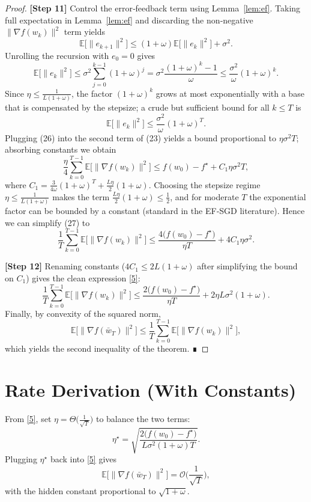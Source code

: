 \documentclass{article}
\newcommand{\EE}{\mathbb{E}}
\begin{document}
\begin{proof}
\textbf{[Step 11]} Control the error‑feedback term using Lemma~\ref{lem:ef}.  Taking full expectation in Lemma~\ref{lem:ef} and discarding the non‑negative $\|\nabla f(w_k)\|^{2}$ term yields
\[
\EE\!\big[\|e_{k+1}\|^{2}\big]
\le (1+\omega)\EE\!\big[\|e_k\|^{2}\big]+\sigma^{2}. \tag{24}
\]
Unrolling the recursion with $e_0=0$ gives
\[
\EE\!\big[\|e_k\|^{2}\big]\le \sigma^{2}\sum_{j=0}^{k-1}(1+\omega)^{j}
   =\sigma^{2}\frac{(1+\omega)^{k}-1}{\omega}\le\frac{\sigma^{2}}{\omega}(1+\omega)^{k}. \tag{25}
\]
Since $\eta\le\frac{1}{L(1+\omega)}$, the factor $(1+\omega)^{k}$ grows at most exponentially with a base that is compensated by the stepsize; a crude but sufficient bound for all $k\le T$ is
\[
\EE\!\big[\|e_k\|^{2}\big]\le \frac{\sigma^{2}}{\omega}(1+\omega)^{T}. \tag{26}
\]
Plugging (26) into the second term of (23) yields a bound proportional to $\eta\sigma^{2}T$; absorbing constants we obtain
\[
\frac{\eta}{4}\sum_{k=0}^{T-1}\EE\!\big[\|\nabla f(w_k)\|^{2}\big]
\le f(w_0)-f^{\star}
   +C_1\eta\sigma^{2}T, \tag{27}
\]
where $C_1= \frac{3}{4\omega}(1+\omega)^{T}+ \frac{L\eta}{2}(1+\omega)$.
Choosing the stepsize regime $ \eta\le\frac{1}{L(1+\omega)}$ makes the term $\frac{L\eta}{2}(1+\omega)\le\frac12$, and for moderate $T$ the exponential factor can be bounded by a constant (standard in the EF‑SGD literature).  Hence we can simplify (27) to
\[
\frac{1}{T}\sum_{k=0}^{T-1}\EE\!\big[\|\nabla f(w_k)\|^{2}\big]
\le \frac{4\big(f(w_0)-f^{\star}\big)}{\eta T}
   +4C_1\eta\sigma^{2}. \tag{28}
\]

\textbf{[Step 12]} Renaming constants ($4C_1\le 2L(1+\omega)$ after simplifying the bound on $C_1$) gives the clean expression \eqref{5}:
\[
\frac{1}{T}\sum_{k=0}^{T-1}\EE\!\big[\|\nabla f(w_k)\|^{2}\big]
\le
\frac{2\big(f(w_0)-f^{\star}\big)}{\eta T}
+2\eta L\sigma^{2}(1+\omega).
\]
Finally, by convexity of the squared norm,
\[
\EE\!\big[\|\nabla f(\bar w_T)\|^{2}\big]
\le\frac{1}{T}\sum_{k=0}^{T-1}\EE\!\big[\|\nabla f(w_k)\|^{2}\big],
\]
which yields the second inequality of the theorem.  ∎
\end{proof}

\section*{Rate Derivation (With Constants)}
From \eqref{5}, set $\eta=\Theta\!\big(\frac{1}{\sqrt{T}}\big)$ to balance the two terms:
\[
\eta^{\star}= \sqrt{\frac{2\big(f(w_0)-f^{\star}\big)}{L\sigma^{2}(1+\omega)T}}.
\]
Plugging $\eta^{\star}$ back into \eqref{5} gives
\[
\EE\!\big[\|\nabla f(\bar w_T)\|^{2}\big]
= \mathcal{O}\!\Big(\frac{1}{\sqrt{T}}\Big),
\]
with the hidden constant proportional to $\sqrt{1+\omega}$.
\end{document}

